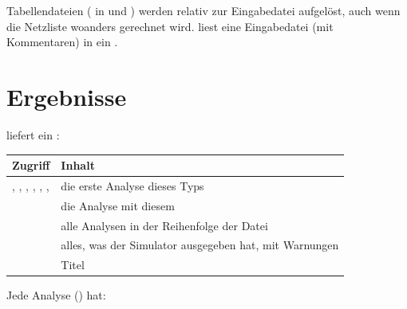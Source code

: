 Tabellendateien ( in  und ) werden
relativ zur Eingabedatei aufgelöst, auch wenn die Netzliste woanders
gerechnet wird.  liest eine Eingabedatei
(mit Kommentaren) in ein .

\section{Ergebnisse}

 liefert ein :

\begin{center}
\begin{tabularx}{\textwidth}{@{}lL@{}}
  \toprule
  Zugriff & Inhalt \\
  \midrule
  , , , , , ,  & die erste Analyse dieses Typs \\
   & die Analyse mit diesem  \\
   & alle Analysen in der Reihenfolge der Datei \\
   & alles, was der Simulator ausgegeben hat, mit Warnungen \\
   & Titel \\
  \bottomrule
\end{tabularx}
\end{center}

Jede Analyse () hat:

